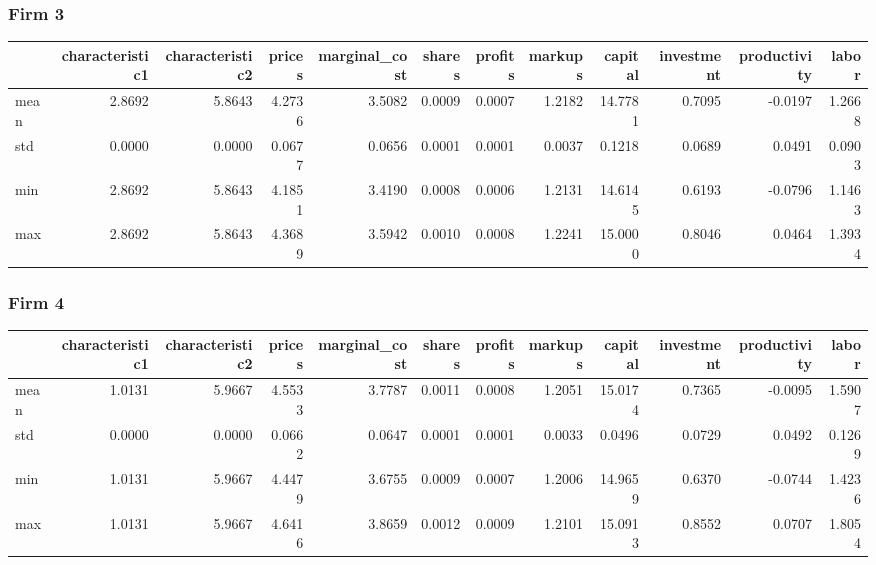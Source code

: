  \subsubsection*{Firm 3}
\begin{tabular}{lrrrrrrrrrrr}
\toprule
{} &  characteristic1 &  characteristic2 &  prices &  marginal\_cost &  shares &  profits &  markups &  capital &  investment &  productivity &  labor \\
\midrule
mean &           2.8692 &           5.8643 &  4.2736 &         3.5082 &  0.0009 &   0.0007 &   1.2182 &  14.7781 &      0.7095 &       -0.0197 & 1.2668 \\
std  &           0.0000 &           0.0000 &  0.0677 &         0.0656 &  0.0001 &   0.0001 &   0.0037 &   0.1218 &      0.0689 &        0.0491 & 0.0903 \\
min  &           2.8692 &           5.8643 &  4.1851 &         3.4190 &  0.0008 &   0.0006 &   1.2131 &  14.6145 &      0.6193 &       -0.0796 & 1.1463 \\
max  &           2.8692 &           5.8643 &  4.3689 &         3.5942 &  0.0010 &   0.0008 &   1.2241 &  15.0000 &      0.8046 &        0.0464 & 1.3934 \\
\bottomrule
\end{tabular}


 \subsubsection*{Firm 4}
\begin{tabular}{lrrrrrrrrrrr}
\toprule
{} &  characteristic1 &  characteristic2 &  prices &  marginal\_cost &  shares &  profits &  markups &  capital &  investment &  productivity &  labor \\
\midrule
mean &           1.0131 &           5.9667 &  4.5533 &         3.7787 &  0.0011 &   0.0008 &   1.2051 &  15.0174 &      0.7365 &       -0.0095 & 1.5907 \\
std  &           0.0000 &           0.0000 &  0.0662 &         0.0647 &  0.0001 &   0.0001 &   0.0033 &   0.0496 &      0.0729 &        0.0492 & 0.1269 \\
min  &           1.0131 &           5.9667 &  4.4479 &         3.6755 &  0.0009 &   0.0007 &   1.2006 &  14.9659 &      0.6370 &       -0.0744 & 1.4236 \\
max  &           1.0131 &           5.9667 &  4.6416 &         3.8659 &  0.0012 &   0.0009 &   1.2101 &  15.0913 &      0.8552 &        0.0707 & 1.8054 \\
\bottomrule
\end{tabular}


